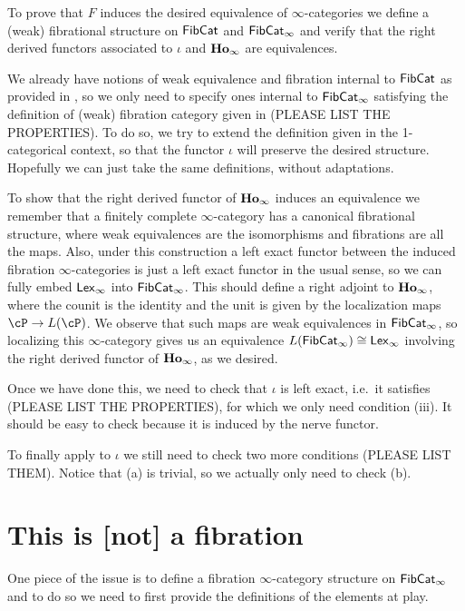 \documentclass[a4paper,12pt,openany]{scrartcl}
\begin{document}
To prove that $F$ induces the desired equivalence of $\infty$-categories we
define a (weak) fibrational structure on $\operatorname{\mathsf{FibCat}}$ and $\operatorname{\mathsf{FibCat}}_\infty$ and
verify that the right derived functors associated to $\iota$ and
$\operatorname{\mathbf{Ho}_\infty}$ are equivalences.

We already have notions of weak equivalence and fibration
internal to $\operatorname{\mathsf{FibCat}}$ as provided in \cite{KS19}, so we only need to specify
ones internal to $\operatorname{\mathsf{FibCat}}_\infty$ satisfying the definition of (weak)
fibration category given in \cite[Def.\ 7.4.12]{Cis19} (PLEASE LIST THE
PROPERTIES). To do so, we try to extend the definition given in the
1-categorical context, so that the functor $\iota$ will preserve the desired
structure. Hopefully we can just take the same definitions, without adaptations.

To show that the right derived functor of $\operatorname{\mathbf{Ho}_\infty}$ induces an equivalence we
remember that a finitely
complete $\infty$-category has a canonical fibrational structure, where weak
equivalences are the isomorphisms and fibrations are all the maps. Also, under
this construction a left exact functor between the induced fibration $\infty$-categories
is just a left exact functor in the usual sense, so we can fully embed
$\operatorname{\mathsf{Lex}_\infty}$ into $\operatorname{\mathsf{FibCat}}_\infty$. This should define a right adjoint to
$\operatorname{\mathbf{Ho}_\infty}$, where the counit is the identity and the unit is given by the
localization maps $\cP\rightarrow L(\cP)$. We observe that such maps are weak
equivalences in $\operatorname{\mathsf{FibCat}}_\infty$, so localizing this $\infty$-category gives us
an equivalence $L(\operatorname{\mathsf{FibCat}}_\infty)\cong\operatorname{\mathsf{Lex}_\infty}$ involving the right derived
functor of $\operatorname{\mathbf{Ho}_\infty}$, as we desired.

Once we have done this, we need to check that $\iota$ is left exact, i.e.\ it
satisfies \cite[Def.\ 7.5.2]{Cis19} (PLEASE LIST THE PROPERTIES), for which we
only need condition (iii). It should be easy to check because it is induced by
the nerve functor.

To finally apply \cite[Thm.\ 7.6.15]{Cis19} to $\iota$ we still need to check
two more conditions (PLEASE LIST THEM). Notice that (a) is trivial, so we
actually only need to check (b).

\section{This is [not] a fibration}

One piece of the issue is to define a fibration $\infty$-category structure on
$\operatorname{\mathsf{FibCat}}_\infty$ and to do so we need to first provide the definitions of the
elements at play.
\end{document}
